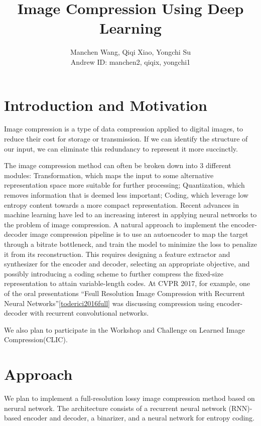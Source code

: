 \documentclass[a4paper]{article}
\title{Image Compression Using Deep Learning}
\author{Manchen Wang, Qiqi Xiao, Yongchi Su
\\ Andrew ID:  manchen2, qiqix, yongchi1}
\begin{document}
\maketitle

\section{Introduction and Motivation}

Image compression is a type of data compression applied to digital images, to reduce their cost for storage or transmission. If we can identify the structure of our input, we can eliminate this redundancy to represent it more succinctly.

The image compression method can often be broken down into 3 different modules: Transformation, which maps the input to some alternative representation space more suitable for further processing; Quantization, which removes information that is deemed less important; Coding, which leverage low entropy content towards a more compact representation. Recent advances in machine learning have led to an increasing interest in applying neural networks to the problem of image compression. A natural approach to implement the encoder-decoder image compression pipeline is to use an autoencoder to map the target through a bitrate bottleneck, and train the model to minimize the loss to penalize it from its reconstruction. This requires designing a feature extractor and synthesizer for the encoder and decoder, selecting an appropriate objective, and possibly introducing a coding scheme to further compress the fixed-size representation to attain variable-length codes. At CVPR 2017, for example, one of the oral presentations ``Fsull Resolution Image Compression with Recurrent Neural Networks''\ref{toderici2016full} was discussing compression using encoder-decoder with recurrent convolutional networks. 

We also plan to participate in the Workshop and Challenge on Learned Image Compression(CLIC).

\section{Approach}

We plan to implement a full-resolution lossy image compression method based on nerural network. The architecture consists of a recurrent neural network (RNN)-based encoder and decoder, a binarizer, and a neural network for entropy coding. 
\end{document}
